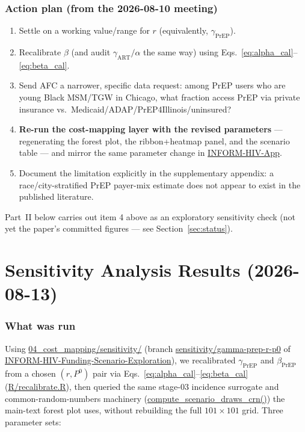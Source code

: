 \documentclass[12pt]{article}
\newcommand{\action}[1]{{\color{actiongreen}#1}}
\begin{document}
\section{Action plan (from the 2026-08-10 meeting)}
\label{sec:action}

\action{\begin{enumerate}
  \item Settle on a working value/range for $r$ (equivalently, $\gamma_{\text{PrEP}}$).
  \item Recalibrate $\beta$ (and audit $\gamma_{\text{ART}}/\alpha$ the same
    way) using Eqs.~\eqref{eq:alpha_cal}--\eqref{eq:beta_cal}.
  \item Send AFC a narrower, specific data request: among PrEP users who are
    young Black MSM/TGW in Chicago, what fraction access PrEP via private
    insurance vs.\ Medicaid/ADAP/PrEP4Illinois/uninsured?
  \item \textbf{Re-run the cost-mapping layer with the revised parameters}
    --- regenerating the forest plot, the ribbon+heatmap panel, and the
    scenario table --- and mirror the same parameter change in
    \url{INFORM-HIV-App}.
  \item Document the limitation explicitly in the supplementary appendix: a
    race/city-stratified PrEP payer-mix estimate does not appear to exist in
    the published literature.
\end{enumerate}}

Part~II below carries out item 4 above as an exploratory sensitivity check
(not yet the paper's committed figures --- see Section~\ref{sec:status}).

\part{Sensitivity Analysis Results (2026-08-13)}
\label{part:results}

\section{What was run}
\label{sec:methods}

Using \url{04_cost_mapping/sensitivity/} (branch
\url{sensitivity/gamma-prep-r-p0} of
\url{INFORM-HIV-Funding-Scenario-Exploration}), we recalibrated
$\gamma_{\text{PrEP}}$ and $\beta_{\text{PrEP}}$ from a chosen $(r, P^0)$
pair via Eqs.~\eqref{eq:alpha_cal}--\eqref{eq:beta_cal}
(\url{R/recalibrate.R}), then queried the same stage-03 incidence
surrogate and common-random-numbers machinery
(\url{compute_scenario_draws_crn()}) the main-text forest plot uses,
without rebuilding the full $101\times101$ grid. Three parameter sets:
\end{document}
